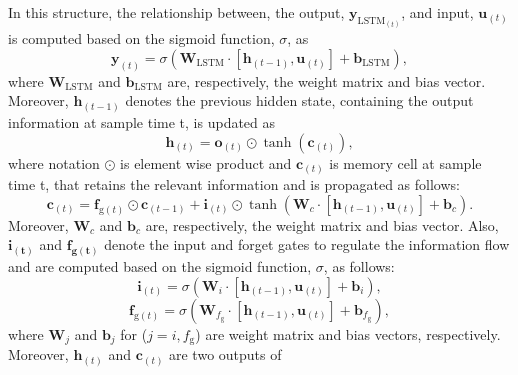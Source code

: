 \documentclass[3p]{elsarticle}
\begin{document}
In this structure, the relationship  between, the output, \(\mathbf{y}_{{\text{LSTM}}_{{(t)}}}\), and input, \(\mathbf{u}_{(t)}\) is computed based on the sigmoid function, \(\sigma\), as
\begin{equation}
	\mathbf{y}_{(t)} = \sigma(\mathbf{W}_{\text{LSTM}} \cdot [\mathbf{h}_{(t-1)}, \mathbf{u}_{(t)}] + \mathbf{b}_{\text{LSTM}}),
\end{equation}
where \(\mathbf{W}_{\text{LSTM}}\) and \(\mathbf{b}_{\text{LSTM}}\) are, respectively, the weight matrix and bias vector.
Moreover, \(\mathbf{h}_{(t-1)}\) denotes the previous hidden state, containing the output information at sample time t, is updated as
\begin{equation}
	\mathbf{h}_{(t)} = \mathbf{o}_{(t)} \odot \tanh(\mathbf{c}_{(t)}),
\end{equation}
where notation \(\odot\) is element wise product and \(\mathbf{c}_{(t)}\) is memory cell at sample time t, that retains the relevant information and is propagated as follows:
\begin{equation}
	\mathbf{c}_{(t)} = \mathbf{f}_{\text{g}(t)} \odot \mathbf{c}_{(t-1)} + \mathbf{i}_{(t)} \odot \tanh(\mathbf{W}_c \cdot [\mathbf{h}_{(t-1)}, \mathbf{u}_{(t)}] + \mathbf{b}_c).
\end{equation}
Moreover, \(\mathbf{W}_c\) and \(\mathbf{b}_c\) are, respectively, the weight matrix and bias vector. Also, \(\mathbf{i_{(t)}}\) and \(\mathbf{f_{\text{g}(t)}}\) denote the input and forget gates to regulate the information flow and are computed based on the sigmoid function, \(\sigma\), as follows:
\begin{equation}
	\mathbf{i}_{(t)} = \sigma(\mathbf{W}_i \cdot [\mathbf{h}_{(t-1)}, \mathbf{u}_{(t)}] + \mathbf{b}_i),
\end{equation}
\begin{equation}
	\mathbf{f}_{\text{g}(t)} = \sigma(\mathbf{W}_{f_{\text{g}}} \cdot [\mathbf{h}_{(t-1)}, \mathbf{u}_{(t)}] + \mathbf{b}_{f_{\text{g}}}),
\end{equation}
where \(\mathbf{W}_j\) and \(\mathbf{b}_j\) for (\(j=i, f_{\text{g}} \)) are weight matrix and bias vectors, respectively.
Moreover, \( \mathbf{h}_{(t)} \) and \( \mathbf{c}_{(t)} \) are two outputs of
\end{document}
